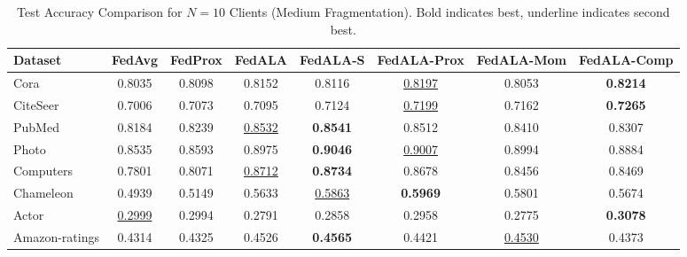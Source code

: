 \documentclass[10pt,conference,compsocconf,letterpaper]{IEEEtran}
\begin{document}
\begin{table}[t]
\centering
\caption{Test Accuracy Comparison for $N=10$ Clients (Medium Fragmentation). Bold indicates best, underline indicates second best.}
\label{tab:results_n10}
\begin{tabular}{@{}lccccccc@{}}
\toprule
\textbf{Dataset} & \textbf{FedAvg} & \textbf{FedProx} & \textbf{FedALA} & \textbf{FedALA-S} & \textbf{FedALA-Prox} & \textbf{FedALA-Mom} & \textbf{FedALA-Comp} \\ \midrule
Cora & 0.8035 & 0.8098 & 0.8152 & 0.8116 & \underline{0.8197} & 0.8053 & \textbf{0.8214} \\
CiteSeer & 0.7006 & 0.7073 & 0.7095 & 0.7124 & \underline{0.7199} & 0.7162 & \textbf{0.7265} \\
PubMed & 0.8184 & 0.8239 & \underline{0.8532} & \textbf{0.8541} & 0.8512 & 0.8410 & 0.8307 \\
Photo & 0.8535 & 0.8593 & 0.8975 & \textbf{0.9046} & \underline{0.9007} & 0.8994 & 0.8884 \\
Computers & 0.7801 & 0.8071 & \underline{0.8712} & \textbf{0.8734} & 0.8678 & 0.8456 & 0.8469 \\
Chameleon & 0.4939 & 0.5149 & 0.5633 & \underline{0.5863} & \textbf{0.5969} & 0.5801 & 0.5674 \\
Actor & \underline{0.2999} & 0.2994 & 0.2791 & 0.2858 & 0.2958 & 0.2775 & \textbf{0.3078} \\
Amazon-ratings & 0.4314 & 0.4325 & 0.4526 & \textbf{0.4565} & 0.4421 & \underline{0.4530} & 0.4373 \\ \bottomrule
\end{tabular}
\end{table}
\end{document}
